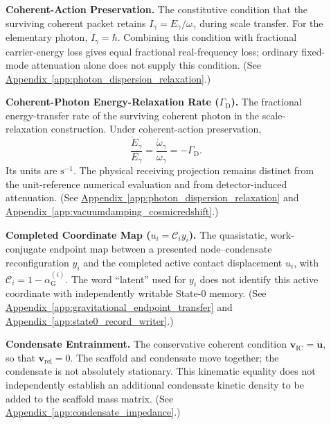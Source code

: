 \begin{description}
\item[] \begin{minipage}[t]{\linewidth}
\textbf{Coherent-Action Preservation.} The constitutive condition that the surviving coherent packet retains $I_\gamma=E_\gamma/\omega_\gamma$ during scale transfer. For the elementary photon, $I_\gamma=\hbar$. Combining this condition with fractional carrier-energy loss gives equal fractional real-frequency loss; ordinary fixed-mode attenuation alone does not supply this condition.
(See \hyperref[app:photon_dispersion_relaxation]{Appendix~\ref*{app:photon_dispersion_relaxation}}.)
\end{minipage}

\item[] \begin{minipage}[t]{\linewidth}
\textbf{Coherent-Photon Energy-Relaxation Rate ($\Gamma_{\mathrm D}$).} The fractional energy-transfer rate of the surviving coherent photon in the scale-relaxation construction. Under coherent-action preservation,
\[
 \frac{\dot E_\gamma}{E_\gamma}
 =\frac{\dot\omega_\gamma}{\omega_\gamma}
 =-\Gamma_{\mathrm D}.
\]
Its units are $\mathrm{s^{-1}}$. The physical receiving projection remains distinct from the unit-reference numerical evaluation and from detector-induced attenuation.
(See \hyperref[app:photon_dispersion_relaxation]{Appendix~\ref*{app:photon_dispersion_relaxation}} and \hyperref[app:vacuumdamping_cosmicredshift]{Appendix~\ref*{app:vacuumdamping_cosmicredshift}}.)
\end{minipage}

\item[] \begin{minipage}[t]{\linewidth}
\textbf{Completed Coordinate Map ($u_i=\mathcal C_i y_i$).} The quasistatic, work-conjugate endpoint map between a presented node--condensate reconfiguration $y_i$ and the completed active contact displacement $u_i$, with $\mathcal C_i=1-\alpha_{\mathrm G}^{(i)}$. The word ``latent'' used for $y_i$ does not identify this active coordinate with independently writable State-0 memory.
(See \hyperref[app:gravitational_endpoint_transfer]{Appendix~\ref*{app:gravitational_endpoint_transfer}} and \hyperref[app:state0_record_writer]{Appendix~\ref*{app:state0_record_writer}}.)
\end{minipage}

\item[] \begin{minipage}[t]{\linewidth}
\textbf{Condensate Entrainment.} The conservative coherent condition $\mathbf v_{\mathrm{IC}}=\dot{\mathbf u}$, so that $\mathbf v_{\mathrm{rel}}=0$. The scaffold and condensate move together; the condensate is not absolutely stationary. This kinematic equality does not independently establish an additional condensate kinetic density to be added to the scaffold mass matrix.
(See \hyperref[app:condensate_impedance]{Appendix~\ref*{app:condensate_impedance}}.)
\end{minipage}


\end{description}
